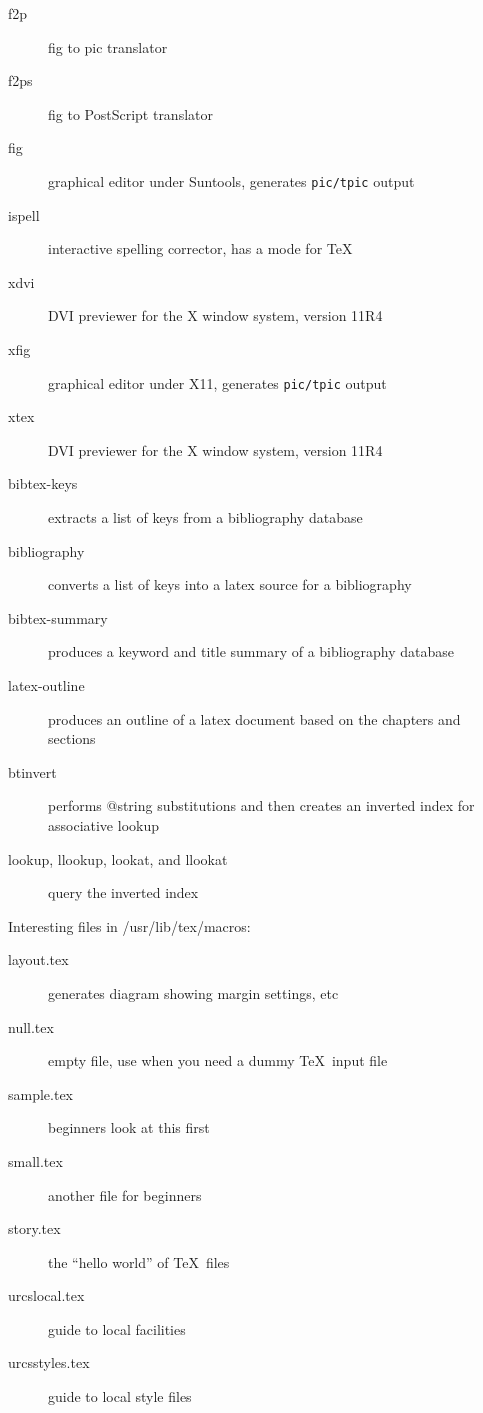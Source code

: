 \begin{description}

\item[f2p] fig to pic translator
\item[f2ps] fig to PostScript translator
\item[fig] graphical editor under Suntools, generates \verb|pic/tpic| output
\item[ispell] interactive spelling corrector, has a mode for \TeX
\item[xdvi] DVI previewer for the X window system, version 11R4
\item[xfig] graphical editor under X11, generates \verb|pic/tpic| output
\item[xtex] DVI previewer for the X window system, version 11R4
\item[bibtex-keys] extracts a list of keys from a bibliography database
\item[bibliography] converts a list of keys into a latex source for a bibliography
\item[bibtex-summary] produces a keyword and title summary of a bibliography database
\item[latex-outline] produces an outline of a latex document based on the chapters and sections
\item[btinvert] performs @string substitutions and then creates an inverted index for associative lookup
\item[lookup, llookup, lookat, and llookat] query the inverted index

\end{description}

Interesting files in /usr/lib/tex/macros:

\begin{description}

\item[layout.tex] generates diagram showing margin settings, etc
\item[null.tex] empty file, use when you need a dummy \TeX\ input file
\item[sample.tex] beginners look at this first
\item[small.tex] another file for beginners
\item[story.tex] the ``hello world'' of \TeX\ files
\item[urcslocal.tex] guide to local facilities
\item[urcsstyles.tex] guide to local style files

\end{description}

